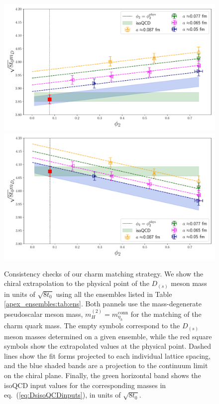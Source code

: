  \begin{figure}
 	\centering
 	\includegraphics[scale=0.23]{./cap6/figs/matching/fit_phi2_mD_etac.pdf}
 	\includegraphics[scale=0.23]{./cap6/figs/matching/fit_phi2_mDs_etac.pdf}
 	\caption{Consistency checks of our charm matching strategy. We show the chiral extrapolation to the physical point of
	the ${D_{(s)}}$ meson mass in units of $\sqrt{8t_0}$ using all the ensembles listed in Table \ref{apex_ensembles:tab:ens}.
	Both pannels use the mass-degenerate pseudoscalar meson mass, $m_H^{(2)}=m_{\eta_h}^{\mathrm{conn}}$ for the matching of the charm quark mass. The empty symbols correspond to the $D_{(s)}$ meson masses determined on a given ensemble,
	while the red square symbols show the extrapolated values at the physical point. Dashed lines
	show the fit forms projected to each individual lattice spacing, and the blue shaded bands
	are a projection to the continuum limit on the chiral plane. Finally, the green horizontal band shows
	the isoQCD input values for the corresponding masses in eq.~(\ref{eq:DsisoQCDinputs}), in units of $\sqrt{8t_0}$.
        }
 	\label{fig:ds_matching} 
 \end{figure}

